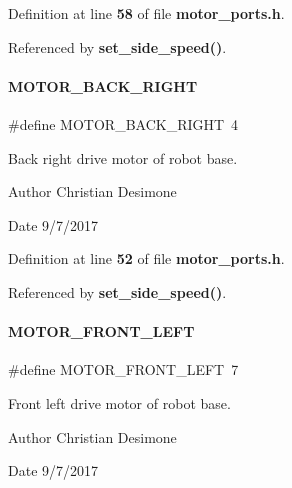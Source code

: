 Definition at line \textbf{ 58} of file \textbf{ motor\+\_\+ports.\+h}.



Referenced by \textbf{ set\+\_\+side\+\_\+speed()}.

\mbox{\label{a00050_ad85c5f3d6a2d00789c8c67b960c46c2b}} 
\paragraph{M\+O\+T\+O\+R\+\_\+\+B\+A\+C\+K\+\_\+\+R\+I\+G\+HT}
{\footnotesize\ttfamily \#define M\+O\+T\+O\+R\+\_\+\+B\+A\+C\+K\+\_\+\+R\+I\+G\+HT~4}



Back right drive motor of robot base. 

\begin{DoxyAuthor}{Author}
Christian Desimone 
\end{DoxyAuthor}
\begin{DoxyDate}{Date}
9/7/2017 
\end{DoxyDate}


Definition at line \textbf{ 52} of file \textbf{ motor\+\_\+ports.\+h}.



Referenced by \textbf{ set\+\_\+side\+\_\+speed()}.

\mbox{\label{a00050_a743b47e164fb23b30f4f2f228db0b338}} 
\paragraph{M\+O\+T\+O\+R\+\_\+\+F\+R\+O\+N\+T\+\_\+\+L\+E\+FT}
{\footnotesize\ttfamily \#define M\+O\+T\+O\+R\+\_\+\+F\+R\+O\+N\+T\+\_\+\+L\+E\+FT~7}



Front left drive motor of robot base. 

\begin{DoxyAuthor}{Author}
Christian Desimone 
\end{DoxyAuthor}
\begin{DoxyDate}{Date}
9/7/2017 
\end{DoxyDate}


